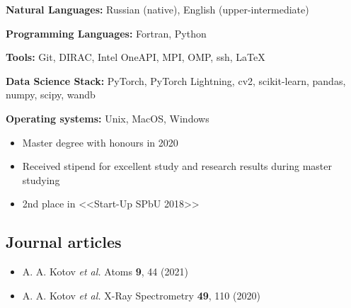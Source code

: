 \documentclass[10pt,a4paper,ragged2e, academicons]{altacv}
\begin{document}

\divider


\textbf{Natural Languages:} Russian (native), English (upper-intermediate)

\textbf{Programming Languages:} Fortran, Python

\textbf{Tools:} Git, DIRAC, Intel OneAPI, MPI, OMP, ssh, LaTeX

\textbf{Data Science Stack:} PyTorch, PyTorch Lightning, cv2, scikit-learn, pandas, numpy, scipy, wandb

\textbf{Operating systems:} Unix, MacOS, Windows

\begin{itemize}
    \item Master degree with honours in 2020
    \item Received stipend for excellent study and research results during master studying
    \item 2nd place in <<Start-Up SPbU 2018>>
\end{itemize}

\newpage
\begin{fullwidth}

    \nocite{*}

    \vspace{-0.5cm}
    \subsection*{Journal articles}
    \begin{itemize}
        \item A. A. Kotov \textit{et al.} Atoms \textbf{9}, 44 (2021)
        \item A. A. Kotov \textit{et al.} X-Ray Spectrometry \textbf{49}, 110 (2020)
    \end{itemize}

    \divider

    \printbibliography[heading=pubtype,title={{Conferences}}, type=inproceedings]
\end{fullwidth}
\end{document}
